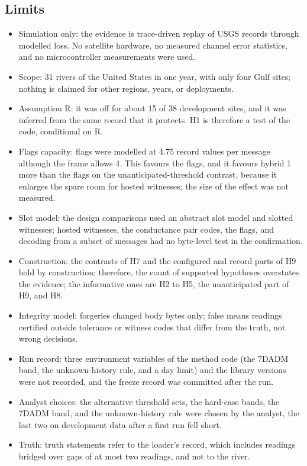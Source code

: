 \subsection{Limits}
\begin{itemize}
  \item Simulation only: the evidence is trace-driven replay of USGS records through modelled loss. No satellite hardware, no measured channel error statistics, and no microcontroller measurements were used.
  \item Scope: 31 rivers of the United States in one year, with only four Gulf sites; nothing is claimed for other regions, years, or deployments.
  \item Assumption R: it was off for about 15 of 38 development sites, and it was inferred from the same record that it protects. H1 is therefore a test of the code, conditional on R.
  \item Flags capacity: flags were modelled at 4.75 record values per message although the frame allows 4. This favours the flags, and it favours hybrid 1 more than the flags on the unanticipated-threshold contrast, because it enlarges the spare room for hosted witnesses; the size of the effect was not measured.
  \item Slot model: the design comparisons used an abstract slot model and slotted witnesses; hosted witnesses, the conductance pair codes, the flags, and decoding from a subset of messages had no byte-level test in the confirmation.
  \item Construction: the contrasts of H7 and the configured and record parts of H9 hold by construction; therefore, the count of supported hypotheses overstates the evidence; the informative ones are H2 to H5, the unanticipated part of H9, and H8.
  \item Integrity model: forgeries changed body bytes only; false means readings certified outside tolerance or witness codes that differ from the truth, not wrong decisions.
  \item Run record: three environment variables of the method code (the 7DADM band, the unknown-history rule, and a day limit) and the library versions were not recorded, and the freeze record was committed after the run.
  \item Analyst choices: the alternative threshold sets, the hard-case bands, the 7DADM band, and the unknown-history rule were chosen by the analyst, the last two on development data after a first run fell short.
  \item Truth: truth statements refer to the loader's record, which includes readings bridged over gaps of at most two readings, and not to the river.

\end{itemize}
